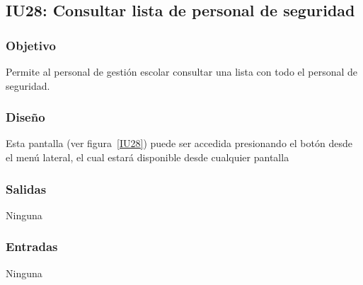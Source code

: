 
\subsection{IU28: Consultar lista de personal de seguridad}
\subsubsection{Objetivo}
   Permite al personal de gestión escolar consultar una lista con todo el personal de seguridad.
\subsubsection{Diseño}
    Esta pantalla  (ver figura~\ref{IU28}) puede ser accedida presionando el botón  desde el menú lateral, el cual estará disponible desde cualquier pantalla

\subsubsection{Salidas}
Ninguna
\subsubsection{Entradas}
Ninguna
